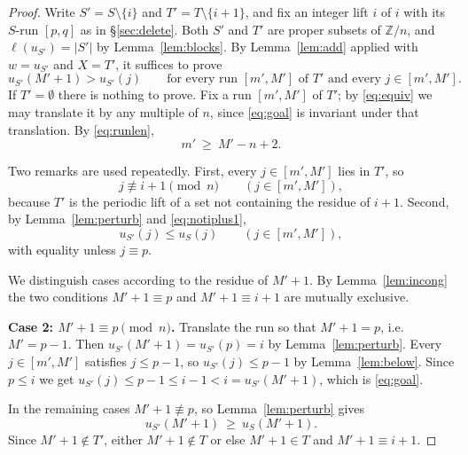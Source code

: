\documentclass[11pt]{article}
\theoremstyle{definition}
\newcommand{\Z}{\mathbb{Z}}
\begin{document}
\begin{proof}
Write $S'=S\setminus\{i\}$ and $T'=T\setminus\{i+1\}$, and fix an integer lift $i$ of $i$ with
its $S$-run $[p,q]$ as in \S\ref{sec:delete}. Both $S'$ and $T'$ are proper subsets of $\Z/n$,
and $\ell(u_{S'})=|S'|$ by Lemma~\ref{lem:blocks}. By Lemma~\ref{lem:add} applied with
$w=u_{S'}$ and $X=T'$, it suffices to prove
\begin{equation}\label{eq:goal}
  u_{S'}(M'+1)>u_{S'}(j)\qquad\text{for every run }[m',M']\text{ of }T'\text{ and every }
  j\in[m',M'].
\end{equation}
If $T'=\emptyset$ there is nothing to prove. Fix a run $[m',M']$ of $T'$; by \eqref{eq:equiv}
we may translate it by any multiple of $n$, since \eqref{eq:goal} is invariant under that
translation. By \eqref{eq:runlen},
\begin{equation}\label{eq:short}
  m'\ \ge\ M'-n+2 .
\end{equation}

Two remarks are used repeatedly. First, every $j\in[m',M']$ lies in $T'$, so
\begin{equation}\label{eq:notiplus1}
  j\not\equiv i+1 \pmod n \qquad (j\in[m',M']),
\end{equation}
because $T'$ is the periodic lift of a set not containing the residue of $i+1$. Second, by
Lemma~\ref{lem:perturb} and \eqref{eq:notiplus1},
\begin{equation}\label{eq:mono}
  u_{S'}(j)\le u_S(j)\qquad (j\in[m',M']),
\end{equation}
with equality unless $j\equiv p$.

We distinguish cases according to the residue of $M'+1$. By Lemma~\ref{lem:incong} the two
conditions $M'+1\equiv p$ and $M'+1\equiv i+1$ are mutually exclusive.

\medskip
\noindent\textbf{Case 2: $M'+1\equiv p\pmod n$.}
Translate the run so that $M'+1=p$, i.e.\ $M'=p-1$. Then $u_{S'}(M'+1)=u_{S'}(p)=i$ by
Lemma~\ref{lem:perturb}. Every $j\in[m',M']$ satisfies $j\le p-1$, so
$u_{S'}(j)\le p-1$ by Lemma~\ref{lem:below}. Since $p\le i$ we get $u_{S'}(j)\le p-1\le i-1<i
=u_{S'}(M'+1)$, which is \eqref{eq:goal}.

\medskip
\noindent In the remaining cases $M'+1\not\equiv p$, so Lemma~\ref{lem:perturb} gives
\begin{equation}\label{eq:up}
  u_{S'}(M'+1)\ \ge\ u_S(M'+1).
\end{equation}
Since $M'+1\notin T'$, either $M'+1\notin T$ or else $M'+1\in T$ and $M'+1\equiv i+1$.


\end{proof}
\end{document}
